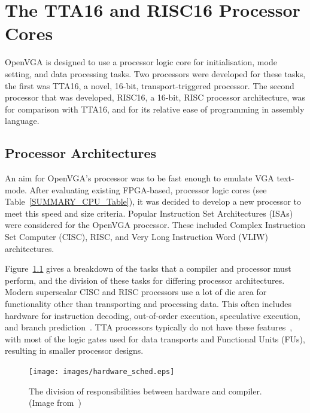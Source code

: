\chapter{The TTA16 and RISC16 Processor Cores}
\label{CPU}

OpenVGA is designed to use a processor logic core for initialisation, mode
setting, and data processing tasks. Two processors were developed for these
tasks, the first was TTA16, a novel, 16-bit, transport-triggered processor. The
second processor that was developed, RISC16, a 16-bit, RISC processor
architecture, was for comparison with TTA16, and for its relative ease of
programming in assembly language.


\section{Processor Architectures}
An aim for OpenVGA's processor was to be fast enough to emulate VGA text-mode.
After evaluating existing FPGA-based, processor logic cores (see
Table~\ref{SUMMARY_CPU_Table}), it was decided to develop a new processor to meet
this speed and size criteria. Popular Instruction Set
Architectures
(ISAs) were considered for the OpenVGA processor. These included Complex
Instruction Set Computer (CISC), RISC, and Very Long Instruction Word (VLIW) architectures.

Figure~\ref{CPU_Sched} gives a breakdown of the tasks that a compiler and
processor must perform, and the division of these tasks for differing processor
architectures. Modern superscalar CISC and RISC processors use a lot of die area
for functionality other than transporting and processing data. This often
includes hardware for instruction decoding, out-of-order execution, speculative
execution, and branch prediction~\cite{parhami2005cam}. TTA processors typically
do not have these features~\cite{corporaal:tta}, with most of the logic gates
used for data transports and Functional Units (FUs), resulting in smaller processor designs.

\begin{figure}[h!]
\begin{center}
\texttt{[image: images/hardware\_sched.eps]}
\caption[The division of responsibilities between hardware and compiler]{The
division of responsibilities between hardware and compiler. (Image
from~\cite{corporaal1999tmi})}
\label{CPU_Sched}
\end{center}
\end{figure}

